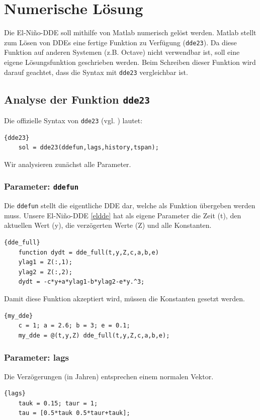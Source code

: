 \section{Numerische Lösung}

Die El-Niño-DDE soll mithilfe von Matlab numerisch gelöst werden.
Matlab stellt zum Lösen von DDEs eine fertige Funktion zu Verfügung (\texttt{dde23}).
Da diese Funktion auf anderen Systemen (z.B. Octave) nicht verwendbar ist, soll eine eigene Lösungsfunktion geschrieben werden.
Beim Schreiben dieser Funktion wird darauf geachtet, dass die Syntax mit \texttt{dde23} vergleichbar ist. 

\subsection{Analyse der Funktion \texttt{dde23}}
Die offizielle Syntax von \texttt{dde23} (vgl. \cite{verzoegert:dde23}) lautet: 
\begin{lstlisting}[style=MATLAB]{dde23}
	sol = dde23(ddefun,lags,history,tspan);
\end{lstlisting}
Wir analysieren zunächst alle Parameter.

\subsubsection{Parameter: \texttt{ddefun}}
Die \texttt{ddefun} stellt die eigentliche DDE dar, welche als Funktion übergeben werden muss.
Unsere El-Niño-DDE \eqref{eldde} hat als eigene Parameter die Zeit (t), den aktuellen Wert (y), die verzögerten Werte (Z) und alle Konstanten.
\begin{lstlisting}[style=MATLAB]{dde_full}
	function dydt = dde_full(t,y,Z,c,a,b,e)
	ylag1 = Z(:,1);
	ylag2 = Z(:,2);
	dydt = -c*y+a*ylag1-b*ylag2-e*y.^3;
\end{lstlisting}
Damit diese Funktion akzeptiert wird, müssen die Konstanten gesetzt werden.
\begin{lstlisting}[style=MATLAB]{my_dde}
	c = 1; a = 2.6; b = 3; e = 0.1;
	my_dde = @(t,y,Z) dde_full(t,y,Z,c,a,b,e);
\end{lstlisting}

\subsubsection{Parameter: lags}
Die Verzögerungen (in Jahren) entsprechen einem normalen Vektor.
\begin{lstlisting}[style=MATLAB]{lags}
	tauk = 0.15; taur = 1;
	tau = [0.5*tauk 0.5*taur+tauk];
\end{lstlisting}

